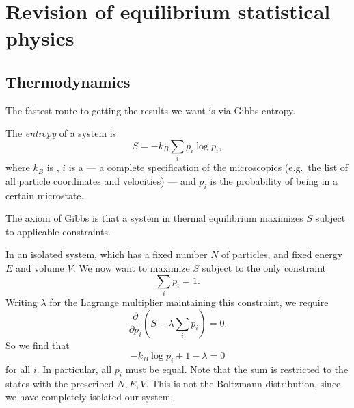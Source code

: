 \documentclass[a4paper]{article}
\begin{document}
\section{Revision of equilibrium statistical physics}
\subsection{Thermodynamics}
The fastest route to getting the results we want is via Gibbs entropy.
\begin{defi}[Entropy]
  The \emph{entropy} of a system is
  \[
    S = - k_B \sum_i p_i \log p_i,
  \]
  where $k_B$ is , $i$ is a  --- a complete specification of the microscopics (e.g.\ the list of all particle coordinates and velocities) --- and $p_i$ is the probability of being in a certain microstate.
\end{defi}

The axiom of Gibbs is that a system in thermal equilibrium maximizes $S$ subject to applicable constraints.
\begin{eg}
  In an isolated system, which has a fixed number $N$ of particles, and fixed energy $E$ and volume $V$. We now want to maximize $S$ subject to the only constraint
  \[
    \sum_i p_i = 1.
  \]
  Writing $\lambda$ for the Lagrange multiplier maintaining this constraint, we require
  \[
    \frac{\partial}{\partial p_i} \left(S - \lambda \sum_i p_i\right) = 0.
  \]
  So we find that
  \[
    -k_B \log p_i + 1 - \lambda = 0
  \]
  for all $i$. In particular, all $p_i$ must be equal. Note that the sum is restricted to the states with the prescribed $N, E, V$. This is not the Boltzmann distribution, since we have completely isolated our system.
\end{eg}
\end{document}
